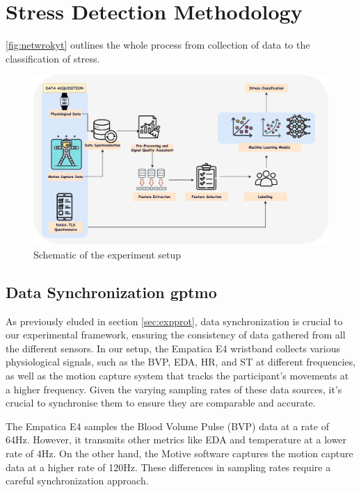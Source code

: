 \chapter{Stress Detection Methodology}

 \autoref{fig:netwrokyt} outlines the whole process from collection of data to the classification of stress.


\begin{figure}[!htbp]
	\centering
	\includegraphics[width=\columnwidth]{images/schematic.pdf}
	\caption{Schematic of the experiment setup}
	\label{fig:netwrokyt}
\end{figure}

\section{Data Synchronization \gls*{gptmo}} \label{sec:synchronization} 
As previously eluded in section \ref{sec:expprot}, data synchronization is crucial to our experimental framework, ensuring the consistency
of data gathered from all the different sensors. In our setup, the Empatica E4 wristband collects various physiological signals, such as the BVP, EDA, HR, and ST at different frequencies, as well as the motion capture system that tracks the participant's movements at a higher frequency. Given the varying sampling rates of these data sources, it's crucial to synchronise them to ensure they are comparable and accurate.

The Empatica E4 samples the Blood Volume Pulse (BVP) data at a rate of 64Hz. However, it transmits other metrics like EDA and temperature at a lower rate of 4Hz. On the other hand, the Motive software captures the motion capture data at a higher rate of 120Hz. These differences in sampling rates require a careful synchronization approach.

